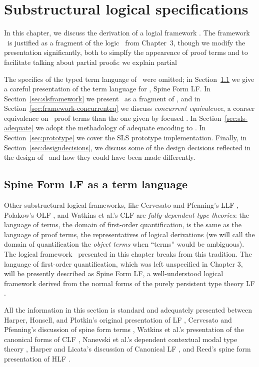 \chapter{Substructural logical specifications}
\label{chapter-framework}

In this chapter, we discuss the derivation of a logial framework
\sls. The framework \sls~is justified as a fragment of the
logic \ollll~from Chapter~3, though we modify the presentation 
significantly, both to simplfy the appearence of proof terms and to
facilitate talking about partial proofs: we explain partial 

The specifics of the typed term language of \ollll~were omitted; in
Section~\ref{sec:sls-termlanguage} we give a careful presentation of
the term language for \sls, Spine Form LF. In
Section~\ref{sec:slsframework} we present \sls~as a fragment of
\ollll, and in Section~\ref{sec:framework-concurrenteq} we discuss
{\it concurrent equivalence}, a coarser equivalence on \sls~proof
terms than the one given by focused \ollll. In
Section~\ref{sec:sls-adequate} we adopt the methadology of adequate
encoding to \sls. In Section~\ref{sec:prototype} we cover the SLS
prototype implementation. Finally, in
Section~\ref{sec:designdecisions}, we discuss some of the design
decisions reflected in the design of \sls~and how they could have been
made differently.

\section{Spine Form LF as a term language}
\label{sec:sls-termlanguage}

Other substructural logical frameworks, like Cervesato and Pfenning's
LLF \cite{cervesato02linear}, Polakow's OLF \cite{polakow01ordered},
and Watkins et al.'s CLF \cite{watkins02concurrent} are {\it
  fully-dependent type theories}: the language of terms, the domain of
first-order quantification, is the same as the language of proof
terms, the representatives of logical derivations (we will call the
domain of quantification the {\it object terms} when ``terms'' would
be ambiguous). The logical framework \sls~presented in this chapter
breaks from this tradition. The language of first-order
quantification, which was left unspecified in Chapter 3, will be
presently described as Spine Form LF, a well-understood logical
framework derived from the normal forms of the purely persistent type
theory LF \cite{harper93framework}.

All the information in this section is standard and adequately
presented between Harper, Honsell, and Plotkin's original presentation
of LF \cite{harper93framework}, Cervesato and Pfenning's discussion of
spine form terms \cite{cervesato02linear}, Watkins et al.'s
presentation of the canonical forms of CLF \cite{watkins02concurrent},
Nanevski et al.'s dependent contextual modal type theory
\cite{nanevski08contextual}, Harper and Licata's discussion of
Canonical LF \cite{harper07mechanizing}, and Reed's spine form
presentation of HLF \cite{reed09hybrid}. 

